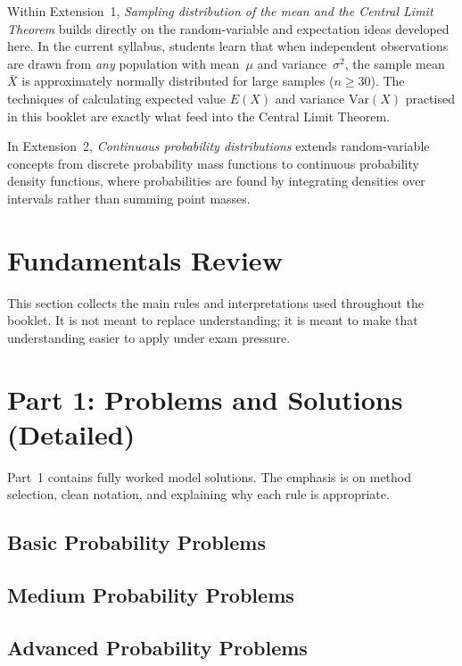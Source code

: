 \documentclass[12pt]{article}
\begin{document}
Within Extension~1, \textit{Sampling distribution of the mean and the Central Limit Theorem} builds directly on the random-variable and expectation ideas developed here. In the current syllabus, students learn that when independent observations are drawn from \emph{any} population with mean~$\mu$ and variance~$\sigma^2$, the sample mean~$\bar{X}$ is approximately normally distributed for large samples ($n \geq 30$). The techniques of calculating expected value $E(X)$ and variance $\mathrm{Var}(X)$ practised in this booklet are exactly what feed into the Central Limit Theorem.

In Extension~2, \textit{Continuous probability distributions} extends random-variable concepts from discrete probability mass functions to continuous probability density functions, where probabilities are found by integrating densities over intervals rather than summing point masses.

\newpage
\section{Fundamentals Review}
This section collects the main rules and interpretations used throughout the booklet. It is not meant to replace understanding; it is meant to make that understanding easier to apply under exam pressure.



\newpage
\section{Part 1: Problems and Solutions (Detailed)}
Part~1 contains fully worked model solutions. The emphasis is on method selection, clean notation, and explaining why each rule is appropriate.

\subsection{Basic Probability Problems}


\subsection{Medium Probability Problems}


\subsection{Advanced Probability Problems}

\end{document}
